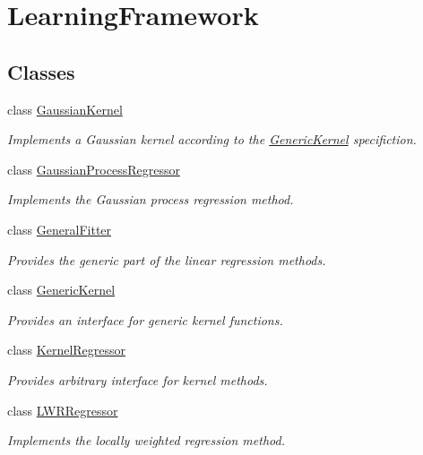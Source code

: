 \hypertarget{group__LearningFramework}{\section{\-Learning\-Framework}
\label{group__LearningFramework}
}
\subsection*{\-Classes}
\begin{DoxyCompactItemize}
\item 
class \hyperlink{classGaussianKernel}{\-Gaussian\-Kernel}
\begin{DoxyCompactList}\small\item\em \-Implements a \-Gaussian kernel according to the \hyperlink{classGenericKernel}{\-Generic\-Kernel} specifiction. \end{DoxyCompactList}\item 
class \hyperlink{classGaussianProcessRegressor}{\-Gaussian\-Process\-Regressor}
\begin{DoxyCompactList}\small\item\em \-Implements the \-Gaussian process regression method. \end{DoxyCompactList}\item 
class \hyperlink{classGeneralFitter}{\-General\-Fitter}
\begin{DoxyCompactList}\small\item\em \-Provides the generic part of the linear regression methods. \end{DoxyCompactList}\item 
class \hyperlink{classGenericKernel}{\-Generic\-Kernel}
\begin{DoxyCompactList}\small\item\em \-Provides an interface for generic kernel functions. \end{DoxyCompactList}\item 
class \hyperlink{classKernelRegressor}{\-Kernel\-Regressor}
\begin{DoxyCompactList}\small\item\em \-Provides arbitrary interface for kernel methods. \end{DoxyCompactList}\item 
class \hyperlink{classLWRRegressor}{\-L\-W\-R\-Regressor}
\begin{DoxyCompactList}\small\item\em \-Implements the locally weighted regression method. \end{DoxyCompactList}\item 

\end{DoxyCompactItemize}
